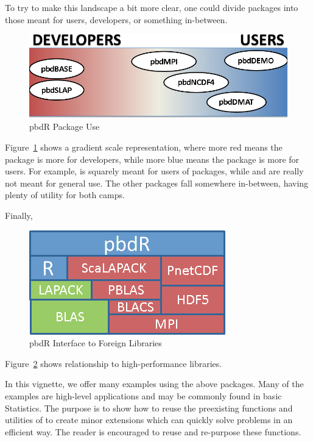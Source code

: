 To try to make this landscape a bit more clear, one could divide
 packages into those meant for users, developers, or
something in-between.  
\begin{figure}[h]
 \centering
 \includegraphics[scale=.55]{pbdDEMO-include/pics/pbdR-packages.png}
 \caption{pbdR Package Use}
 \label{fig:pbdrpackages2}
\end{figure}
Figure~\ref{fig:pbdrpackages2} shows a gradient scale representation, where
more red means the package is more for developers, while more blue means the
package is more for users.  For example,  is squarely meant for
users of  packages, while  and  are
really not meant for general use. The other packages fall somewhere
in-between, having plenty of utility for both camps.

Finally, 
\begin{figure}[h]
 \centering
 \includegraphics[scale=.85]{pbdDEMO-include/pics/libs.png}
 \caption{pbdR Interface to Foreign Libraries}
 \label{fig:pbdrlibs}
\end{figure}
Figure~\ref{fig:pbdrlibs} shows  relationship to
high-performance libraries.

In this vignette, we offer many examples using the above 
packages. Many of the examples are high-level applications and may be commonly
found in basic Statistics. The purpose is to show how to reuse the
preexisting functions and utilities of  to create minor
extensions which can quickly solve problems in an efficient way.
The reader is encouraged to reuse and re-purpose these functions.

